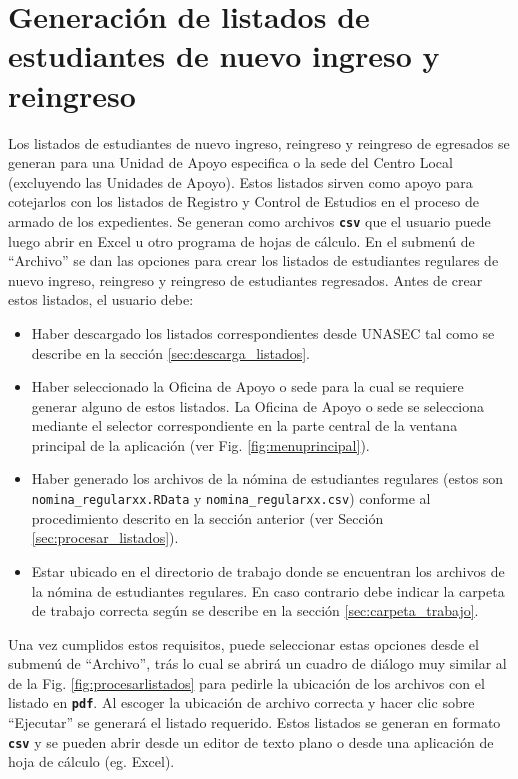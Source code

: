 \documentclass[letterpaper,12pt]{book}
\newcommand{\archivo}[1]
{\texttt{#1}}
\newcommand{\fileformat}[1]{\textbf{\texttt{#1}}}
\begin{document}
\section{Generación de listados de estudiantes de nuevo ingreso y reingreso}

Los listados de estudiantes de nuevo ingreso, reingreso y reingreso de egresados se generan para una Unidad de Apoyo especifica o la sede del Centro Local (excluyendo las Unidades de Apoyo). Estos listados sirven como apoyo para cotejarlos con los listados de Registro y Control de Estudios en el proceso de armado de los expedientes. Se generan como archivos \fileformat{csv} que el usuario puede luego abrir en Excel u otro programa de hojas de cálculo. En el submenú de ``Archivo'' se dan las opciones para crear los listados de estudiantes regulares de nuevo ingreso, reingreso y reingreso de estudiantes regresados. Antes de crear estos listados, el usuario debe:

\begin{itemize}
	\item Haber descargado los listados correspondientes desde UNASEC tal como se describe en la sección \ref{sec:descarga_listados}.
	\item Haber seleccionado la Oficina de Apoyo o sede para la cual se requiere generar alguno de estos listados. La Oficina de Apoyo o sede se selecciona mediante el selector correspondiente en la parte central de la ventana principal de la aplicación (ver Fig. \ref{fig:menuprincipal}).
	\item Haber generado los archivos de la nómina de estudiantes regulares (estos son \archivo{nomina\_regularxx.RData} y \archivo{nomina\_regularxx.csv}) conforme al procedimiento descrito en la sección anterior (ver Sección \ref{sec:procesar_listados}).
	\item Estar ubicado en el directorio de trabajo donde se encuentran los archivos de la nómina de estudiantes regulares. En caso contrario debe indicar la carpeta de trabajo correcta según se describe en la sección \ref{sec:carpeta_trabajo}.
\end{itemize}

Una vez cumplidos estos requisitos, puede seleccionar estas opciones desde el submenú de ``Archivo'', trás lo cual se abrirá un cuadro de diálogo muy similar al de la Fig. \ref{fig:procesarlistados} para pedirle la ubicación de los archivos con el listado en \fileformat{pdf}. Al escoger la ubicación de archivo correcta y hacer clic sobre ``Ejecutar'' se generará el listado requerido. Estos listados se generan en formato \fileformat{csv} y se pueden abrir desde un editor de texto plano o desde una aplicación de hoja de cálculo (eg. Excel).
\end{document}

